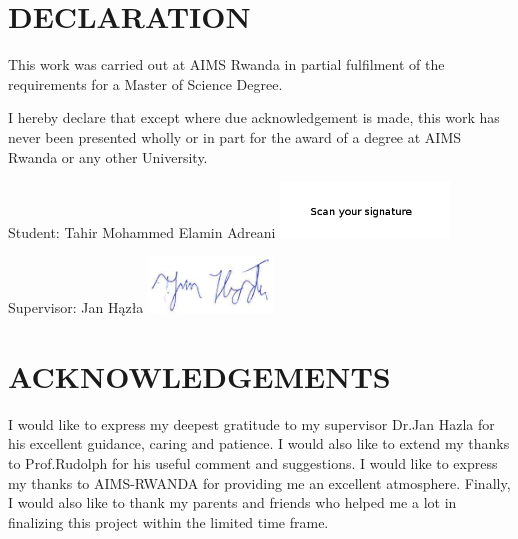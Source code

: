 \chapter*{DECLARATION}
This work was carried out at AIMS Rwanda in partial fulfilment of the requirements for a Master of Science Degree.

I hereby declare that except where due acknowledgement is made, this work has never been presented wholly or in part for the award of a degree at AIMS Rwanda or any other University.

\vspace{1.5cm}
Student: Tahir Mohammed Elamin Adreani \includegraphics[height=1.5cm]{images/signature.png}

\vspace{1.5cm}

Supervisor: Jan Hązła \includegraphics[height=1.5cm]{images/jh_signature.png}


\newpage

\chapter*{ACKNOWLEDGEMENTS}
I would like to express my deepest gratitude to my supervisor Dr.Jan Hazla for his excellent guidance, caring and patience. I would also like to extend my thanks to Prof.Rudolph for his useful comment and suggestions. I would like to express my thanks to AIMS-RWANDA for providing me an excellent atmosphere. Finally, I would also like to thank my parents and friends who helped me a lot in finalizing this project within the limited time frame.
%
\newpage
%
